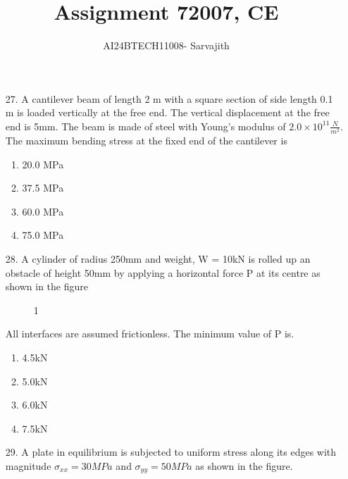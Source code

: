 \documentclass[journal]{IEEEtran}
\begin{document}

\vspace{3cm}


\author{AI24BTECH11008- Sarvajith
}
\title{Assignment 7}
{\let\newpage\relax\maketitle}
\title{2007, CE}
\renewcommand{\thefigure}{\theenumi}
\renewcommand{\thetable}{\theenumi}
\setlength{\intextsep}{10pt} %
\renewcommand{\thetable}{\theenumi}
\begin{enumerate}
    \item[27.] A cantilever beam of length 2 m with a square section of side length 0.1 m is loaded vertically at the free end. The vertical displacement at the free end is 5mm. The beam is made of steel with Young's modulus of $2.0\times 10^{11}\frac{N}{m^2}$. The maximum bending stress at the fixed end of the cantilever is 
    \begin{enumerate}[label=(\Alph*)]
        \item 20.0 MPa
        \item 37.5 MPa
        \item 60.0 MPa
        \item 75.0 MPa
    \end{enumerate}
    \item[28.] A cylinder of radius 250mm and weight, W = 10kN is rolled up an obstacle of height 50mm by applying a horizontal force P at its centre as shown in the figure
    \begin{figure}[!ht]
        \centering
        \caption{1}
    \end{figure}
    All interfaces are assumed frictionless. The minimum value of P is.
    \begin{enumerate}[label=(\Alph*)]
        \item 4.5kN
        \item 5.0kN
        \item 6.0kN
        \item 7.5kN
    \end{enumerate}
    \item[29.] A plate in equilibrium is subjected to uniform stress along its edges with magnitude $\sigma_{xx}=30MPa$ and $\sigma_{yy}=50MPa$ as shown in the figure.

\end{enumerate}
\end{document}
